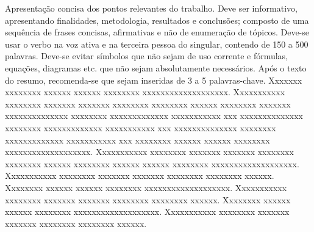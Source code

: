 Apresentação concisa dos pontos relevantes do trabalho. Deve ser informativo, apresentando finalidades, metodologia, resultados e conclusões; composto de uma sequência de frases concisas, afirmativas e não de enumeração de tópicos. Deve-se usar o verbo na voz ativa e na terceira pessoa do singular, contendo de 150 a 500 palavras. Deve-se evitar símbolos que não sejam de uso corrente e fórmulas, equações, diagramas etc. que não sejam absolutamente necessários. Após o texto do resumo, recomenda-se que sejam inseridas de 3 a 5 palavras-chave. Xxxxxxx xxxxxxxx xxxxxx xxxxxx xxxxxxxx xxxxxxxxxxxxxxxxxxx. Xxxxxxxxxxx xxxxxxxx xxxxxxx xxxxxxx xxxxxxxx xxxxxxxx xxxxxx xxxxxxxx xxxxxxx xxxxxxxxxxxxxx  xxxxxxxx xxxxxxxxxxxxx xxxxxxxxxxx  xxx xxxxxxxxxxxxxx  xxxxxxxx xxxxxxxxxxxxx xxxxxxxxxxx  xxx xxxxxxxxxxxxxx  xxxxxxxx xxxxxxxxxxxxx xxxxxxxxxxx  xxx xxxxxxxx xxxxxx xxxxxx xxxxxxxx xxxxxxxxxxxxxxxxxxx. Xxxxxxxxxxx xxxxxxxx xxxxxxx xxxxxxx xxxxxxxx xxxxxxxx xxxxxx xxxxxxxx xxxxxx xxxxxx xxxxxxxx xxxxxxxxxxxxxxxxxxx. Xxxxxxxxxxx xxxxxxxx xxxxxxx xxxxxxx xxxxxxxx xxxxxxxx xxxxxx. Xxxxxxxx xxxxxx xxxxxx xxxxxxxx xxxxxxxxxxxxxxxxxxx. Xxxxxxxxxxx xxxxxxxx xxxxxxx xxxxxxx xxxxxxxx xxxxxxxx xxxxxx. Xxxxxxxx xxxxxx xxxxxx xxxxxxxx xxxxxxxxxxxxxxxxxxx. Xxxxxxxxxxx xxxxxxxx xxxxxxx xxxxxxx xxxxxxxx xxxxxxxx xxxxxx.

